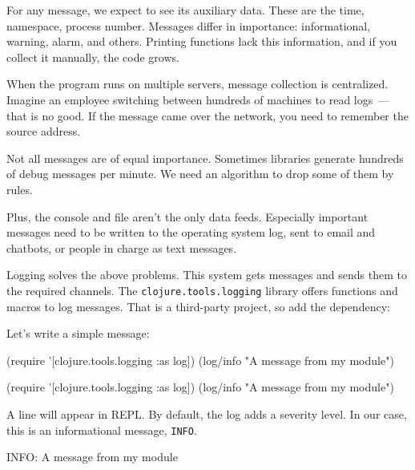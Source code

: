 For any message, we expect to see its auxiliary data. These are the time, namespace, process number. Messages differ in importance: informational, warning, alarm, and others. Printing functions lack this information, and if you collect it manually, the code grows.

When the program runs on multiple servers, message collection is centralized. Imagine an employee switching between hundreds of machines to read logs~--- that is no good. If the message came over the network, you need to remember the source address.

Not all messages are of equal importance. Sometimes libraries generate hundreds of debug messages per minute. We need an algorithm to drop some of them by rules.

Plus, the console and file aren't the only data feeds. Especially important messages need to be written to the operating system log, sent to email and chatbots, or people in charge as text messages.

Logging solves the above problems. This system gets messages and sends them to the required channels. The \verb|clojure.tools.logging| library offers functions and macros to log messages. That is a third-party project, so add the dependency:


\begin{clojure}
\end{clojure}

\noindent
Let's write a simple message:

\ifnarrow

\begin{clojure}
(require
  '[clojure.tools.logging :as log])
(log/info "A message from my module")
\end{clojure}

\else

\begin{clojure}
(require '[clojure.tools.logging :as log])
(log/info "A message from my module")
\end{clojure}

\fi

\noindent
A line will appear in REPL. By default, the log adds a severity level. In our case, this is an informational message, \verb|INFO|.

\begin{text}
INFO: A message from my module
\end{text}

